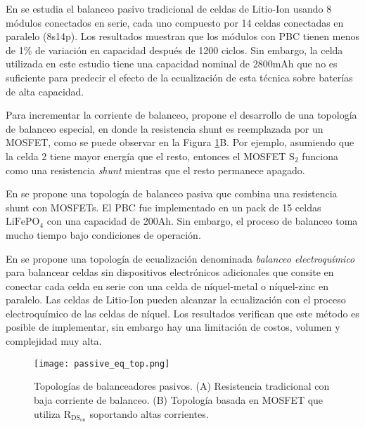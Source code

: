En \cite{CAMPESTRINI2016142} se estudia el balanceo pasivo tradicional de celdas 
de Litio-Ion usando 8 m\'odulos conectados en serie, cada uno compuesto por 14 
celdas conectadas en paralelo (8s14p). Los resultados muestran que los m\'odulos 
con \acrshort{PBC} tienen menos de 1\% de variaci\'on en capacidad despu\'es de 
1200 ciclos. Sin embargo, la celda utilizada en este estudio tiene una capacidad
nominal de 2800mAh que no es suficiente para predecir el efecto de la
ecualizaci\'on de esta t\'ecnica sobre bater\'ias de alta capacidad.

Para incrementar la corriente de balanceo, \cite{XU20192948} propone el 
desarrollo de una topolog\'ia de balanceo especial, en donde la resistencia 
shunt es reemplazada por un MOSFET, como se puede observar en la Figura
\ref{passive_eq_top}B. Por ejemplo, asumiendo que la celda 2 tiene mayor
energ\'ia que el resto, entonces el MOSFET $\mathrm{S_2}$ funciona como una
resistencia \emph{shunt} mientras que el resto permanece apagado. 

\newpage

En \cite{amin_et_al_bal} se propone una topolog\'ia de balanceo pasiva que 
combina una resistencia shunt con MOSFETs. El \acrshort{PBC} fue implementado 
en un pack de 15 celdas $\mathrm{LiFePO_4}$ con una capacidad de 200Ah. Sin 
embargo, el proceso de balanceo toma mucho tiempo bajo condiciones de 
operaci\'on.

En \cite{SCHMID201749} se propone una topolog\'ia de ecualizaci\'on denominada 
\emph{balanceo electroqu\'imico} para balancear celdas sin dispositivos 
electr\'onicos adicionales que consite en conectar cada celda en serie con una 
celda de n\'iquel-metal o n\'iquel-zinc en paralelo. Las celdas de Litio-Ion 
pueden alcanzar la ecualizaci\'on con el proceso electroqu\'imico de las celdas de 
n\'iquel. Los resultados verifican que este m\'etodo es posible de implementar, 
sin embargo hay una limitaci\'on de costos, volumen y complejidad muy alta.

\begin{figure}[h!]
    \begin{center}
        \texttt{[image: passive\_eq\_top.png]}
        \caption{Topolog\'ias de balanceadores pasivos. (A) Resistencia
        tradicional con baja corriente de balanceo. (B) Topolog\'ia basada en
        MOSFET que utiliza $\mathrm{R_{DS_{on}}}$ soportando altas corrientes.}
        \label{passive_eq_top}
    \end{center}
\end{figure}

